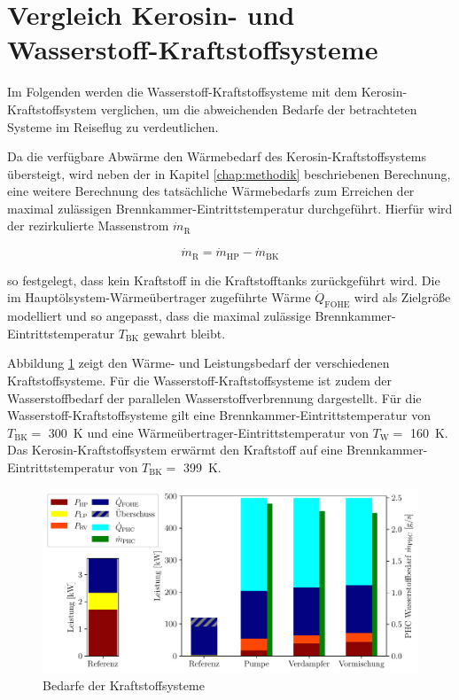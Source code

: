 \section{Vergleich Kerosin- und Wasserstoff-Kraftstoffsysteme}

Im Folgenden werden die Wasserstoff-Kraftstoffsysteme mit dem Kerosin-Kraftstoffsystem verglichen, um die abweichenden Bedarfe der betrachteten Systeme im Reiseflug zu verdeutlichen. 

Da die verfügbare Abwärme den Wärmebedarf des Kerosin-Kraftstoffsystems übersteigt, wird neben der in Kapitel \ref{chap:methodik} beschriebenen Berechnung, eine weitere Berechnung des tatsächliche Wärmebedarfs zum Erreichen der maximal zulässigen Brennkammer-Eintrittstemperatur durchgeführt. Hierfür wird der rezirkulierte Massenstrom $\dot{m}_\mathrm{R}$

\begin{equation}
	 \dot{m}_\mathrm{R}=\dot{m}_\mathrm{HP}-\dot{m}_\mathrm{BK} 
\end{equation}
 
so festgelegt, dass kein Kraftstoff in die Kraftstofftanks zurückgeführt wird. Die im Hauptölsystem-Wärmeübertrager zugeführte Wärme $\dot{Q}_\mathrm{FOHE}$ wird als Zielgröße modelliert und so angepasst, dass die maximal zulässige Brennkammer-Eintrittstemperatur $T_\mathrm{BK}$ gewahrt bleibt.

Abbildung \ref{fig:refcomp} zeigt den Wärme- und Leistungsbedarf der verschiedenen Kraftstoffsysteme. Für die Wasserstoff-Kraftstoffsysteme ist zudem der Wasserstoffbedarf der parallelen Wasserstoffverbrennung dargestellt. Für die Wasserstoff-Kraftstoffsysteme gilt eine Brennkammer-Eintrittstemperatur von $T_\mathrm{BK}=$ \SI{300}{\K} und eine Wärmeübertrager-Eintrittstemperatur von $T_\mathrm{W}=$ \SI{160}{\K}. Das Kerosin-Kraftstoffsystem erwärmt den Kraftstoff auf eine Brennkammer-Eintrittstemperatur von $T_\mathrm{BK}=$ \SI{399}{\K}.

\begin{figure}[ht]
\centering
\includegraphics[width=1\linewidth]{4_Abbildungen/2_Hauptteil/Ergebnisse/refcomp.pdf}
  \caption{Bedarfe der Kraftstoffsysteme}
  \label{fig:refcomp}
\end{figure}
\FloatBarrier

